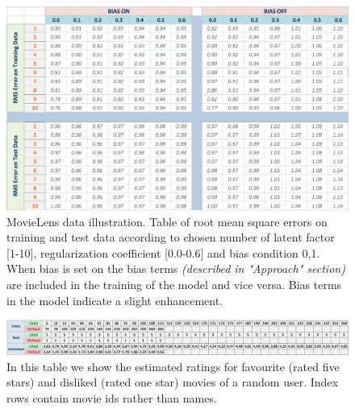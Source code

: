 \documentclass[11pt]{article}
\begin{document}
	\begin{figure}[H]
		\centering		
		\includegraphics[width=0.85\columnwidth]{buff5/l_reg_err}
		\caption{MovieLens data illustration. Table  of root mean square errors on training and test data according to chosen number of latent factor [1-10], regularization coefficient [0.0-0.6] and bias condition {0,1}. When bias is set on the bias terms \textit{(described in "Approach" section)} are included in the training of the model and vice versa. Bias terms in the model indicate a slight enhancement.}
		\label{5}		
	\end{figure}
		
	\begin{figure}[H]
		\centering		
		\includegraphics[width=\columnwidth]{buff5/recom_val}
		\caption{In this table we show the estimated ratings for favourite (rated five stars) and disliked (rated one star) movies of a random user. Index rows contain movie ids rather than names.}
		\label{5}		
	\end{figure}
	
	\vspace{15mm}
	
\end{document}
